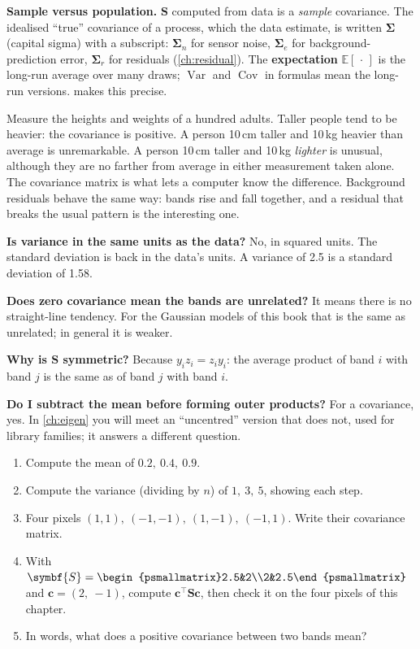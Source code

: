 \documentclass[11pt,a4paper,oneside,openany]{book}
\newcommand{\B}[1]{{\symbf{#1}}}
\newcommand{\B}[1]{{\bm{#1}}}
\newcommand{\T}{^{\top}}
\newcommand{\E}{\mathbb{E}}
\newcommand{\Var}{\operatorname{Var}}
\newcommand{\Cov}{\operatorname{Cov}}
\newcommand{\vc}{\B{c}}
\newcommand{\mS}{\B{S}}
\newcommand{\mSig}{\B{\Sigma}}
\begin{document}
\textbf{Sample versus population.} $\mS$ computed from data is a \emph{sample} covariance. The idealised ``true'' covariance
of a process, which the data estimate, is written $\mSig$ (capital sigma) with a subscript: $\mSig_n$ for sensor noise,
$\mSig_e$ for background-prediction error, $\mSig_r$ for residuals (\cref{ch:residual}). The \textbf{expectation} $\E[\,\cdot\,]$
is the long-run average over many draws; $\Var$ and $\Cov$ in formulas mean the long-run versions.  makes this
precise.

\begin{analogy}
Measure the heights and weights of a hundred adults. Taller people tend to be heavier: the covariance is positive. A person
10\,cm taller and 10\,kg heavier than average is unremarkable. A person 10\,cm taller and 10\,kg \emph{lighter} is unusual,
although they are no farther from average in either measurement taken alone. The covariance matrix is what lets a computer
know the difference. Background residuals behave the same way: bands rise and fall together, and a residual that breaks the
usual pattern is the interesting one.
\end{analogy}

\begin{confusions}
\textbf{Is variance in the same units as the data?} No, in squared units. The standard deviation is back in the data's
units. A variance of 2.5 is a standard deviation of 1.58.

\textbf{Does zero covariance mean the bands are unrelated?} It means there is no straight-line tendency. For the Gaussian
models of this book that is the same as unrelated; in general it is weaker.

\textbf{Why is $\mS$ symmetric?} Because $y_iz_i=z_iy_i$: the average product of band $i$ with band $j$ is the same as of band
$j$ with band $i$.

\textbf{Do I subtract the mean before forming outer products?} For a covariance, yes. In \cref{ch:eigen} you will meet an
``uncentred'' version that does not, used for library families; it answers a different question.
\end{confusions}

\begin{checkyourself}
\begin{enumerate}
\item Compute the mean of $0.2,\ 0.4,\ 0.9$.
\item Compute the variance (dividing by $n$) of $1,\ 3,\ 5$, showing each step.
\item Four pixels $(1,1),\ (-1,-1),\ (1,-1),\ (-1,1)$. Write their covariance matrix.
\item With $\mS=\begin{psmallmatrix}2.5&2\\2&2.5\end{psmallmatrix}$ and $\vc=(2,\ -1)$, compute $\vc\T\mS\vc$, then check it on the
  four pixels of this chapter.
\item In words, what does a positive covariance between two bands mean?
\end{enumerate}
\end{checkyourself}
\end{document}
